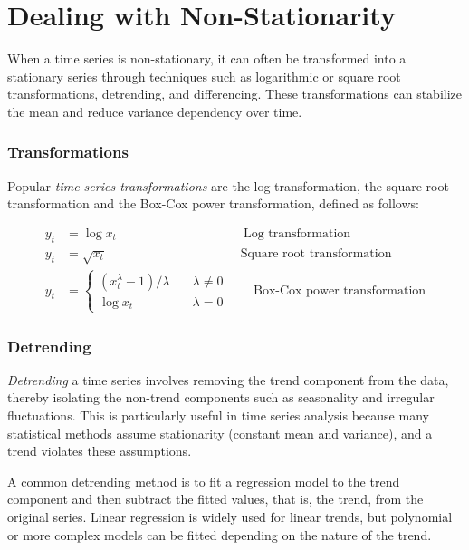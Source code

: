 \section{Dealing with Non-Stationarity}

When a time series is non-stationary, it can often be transformed into a stationary series through techniques such as logarithmic or square root transformations, detrending, and differencing. These transformations can stabilize the mean and reduce variance dependency over time.

\subsubsection*{Transformations}

Popular \emph{time series transformations} are the log transformation, the square root transformation and the Box-Cox power transformation, defined as follows:

\begin{align*}y_t &= \log x_t \qquad \qquad \qquad \qquad \qquad \text{Log transformation}\\
  y_t &= \sqrt{x_t} \qquad \qquad \; \; \qquad \qquad \qquad \text{Square root transformation} \\
  y_t &= \begin{cases}(x_t^\lambda-1)/\lambda &\quad \lambda\neq0 \\
  \log x_t &\quad \lambda=0
  \end{cases} \qquad \text{Box-Cox power transformation}
\end{align*}

\subsubsection*{Detrending}

\emph{Detrending} a time series involves removing the trend component from the data, thereby isolating the non-trend components such as seasonality and irregular fluctuations. This is particularly useful in time series analysis because many statistical methods assume stationarity (constant mean and variance), and a trend violates these assumptions.

A common detrending method is to fit a regression model to the trend component and then subtract the fitted values, that is, the trend, from the original series. Linear regression is widely used for linear trends, but polynomial or more complex models can be fitted depending on the nature of the trend.

